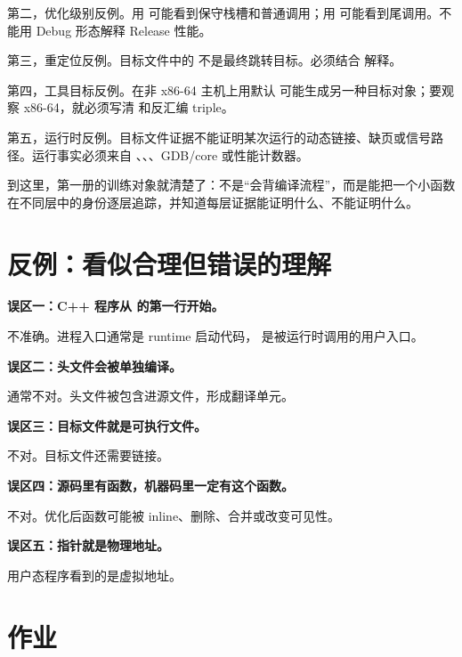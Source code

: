第二，优化级别反例。用  可能看到保守栈槽和普通调用；用  可能看到尾调用。不能用 Debug 形态解释 Release 性能。

第三，重定位反例。目标文件中的  不是最终跳转目标。必须结合  解释。

第四，工具目标反例。在非 x86-64 主机上用默认  可能生成另一种目标对象；要观察 x86-64，就必须写清  和反汇编 triple。

第五，运行时反例。目标文件证据不能证明某次运行的动态链接、缺页或信号路径。运行事实必须来自 、、、GDB/core 或性能计数器。

到这里，第一册的训练对象就清楚了：不是“会背编译流程”，而是能把一个小函数在不同层中的身份逐层追踪，并知道每层证据能证明什么、不能证明什么。

\section{反例：看似合理但错误的理解}

\begin{warningbox}
\textbf{误区一：C++ 程序从  的第一行开始。}

不准确。进程入口通常是 runtime 启动代码， 是被运行时调用的用户入口。

\textbf{误区二：头文件会被单独编译。}

通常不对。头文件被包含进源文件，形成翻译单元。

\textbf{误区三：目标文件就是可执行文件。}

不对。目标文件还需要链接。

\textbf{误区四：源码里有函数，机器码里一定有这个函数。}

不对。优化后函数可能被 inline、删除、合并或改变可见性。

\textbf{误区五：指针就是物理地址。}

用户态程序看到的是虚拟地址。
\end{warningbox}

\section{作业}

